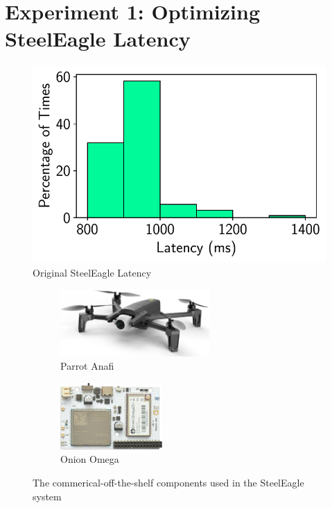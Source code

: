 \section{Experiment 1: Optimizing SteelEagle Latency}
\label{sec:exp1}

\begin{figure}[htbp]
\centerline{\includegraphics[width = .4\textwidth]{figs/bala_latency.pdf}}
\caption{Original SteelEagle Latency \cite{bala2024}}
\label{fig:steeleagle-original-latency}
\end{figure}

\begin{figure}[b]
    \centering
    \begin{subfigure}[t]{0.45\textwidth}
        \centering
        \includegraphics[height=1in]{figs/parrot-anafi.pdf}
        \caption{Parrot Anafi}
        \label{fig:parrot-anafi}
    \end{subfigure}
    \begin{subfigure}[t]{0.45\textwidth}
        \centering
        \includegraphics[height=1in]{figs/onion-omega.png}
        \caption{Onion Omega}
        \label{fig:onion-omega}
    \end{subfigure}
    \caption{The commerical-off-the-shelf components used in the SteelEagle system}
\end{figure}


